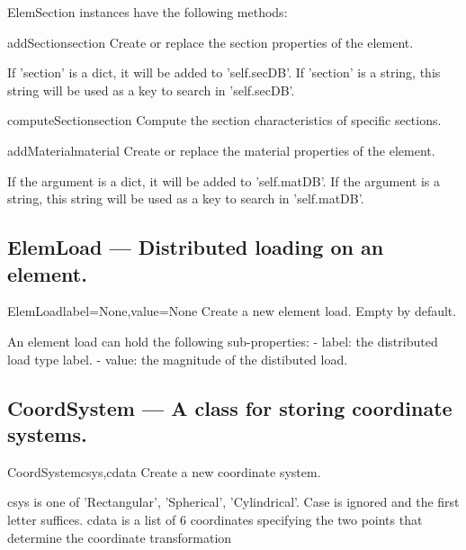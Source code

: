 ElemSection instances have the following methods:

\begin{funcdesc}{addSection}{section}
Create or replace the section properties of the element.

        If 'section' is a dict, it will be added to 'self.secDB'.
        If 'section' is a string, this string will be used as a key to
        search in 'self.secDB'.
        
\end{funcdesc}

\begin{funcdesc}{computeSection}{section}
Compute the section characteristics of specific sections.
\end{funcdesc}

\begin{funcdesc}{addMaterial}{material}
Create or replace the material properties of the element.

        If the argument is a dict, it will be added to 'self.matDB'.
        If the argument is a string, this string will be used as a key to
        search in 'self.matDB'.
        
\end{funcdesc}

\subsection{ElemLoad --- Distributed loading on an element.}


\begin{classdesc}{ElemLoad}{label=None,value=None}
Create a new element load. Empty by default.
        
        An element load can hold the following sub-properties:
        - label: the distributed load type label.
        - value: the magnitude of the distibuted load.
        
\end{classdesc}

\subsection{CoordSystem --- A class for storing coordinate systems.}


\begin{classdesc}{CoordSystem}{csys,cdata}
Create a new coordinate system.

        csys is one of 'Rectangular', 'Spherical', 'Cylindrical'. Case is
          ignored and the first letter suffices.
        cdata is a list of 6 coordinates specifying the two points that
          determine the coordinate transformation 
        
\end{classdesc}


